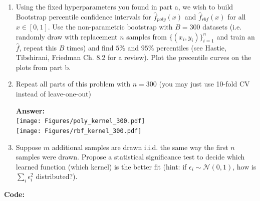 \documentclass{article}
\newcommand{\1}{\mathbf{1}}
\begin{document}
\begin{enumerate}
  \item Using the fixed hyperparameters you found in part a, we wish to build Bootstrap percentile confidence intervals for $\widehat{f}_{poly}(x)$ and $\widehat{f}_{rbf}(x)$ for all $x \in [0,1]$.
  Use the non-parametric bootstrap with $B=300$ datasets (i.e. randomly draw with replacement $n$ samples from $\{(x_i,y_i)\}_{i=1}^n$ and train an $\widehat{f}$, repeat this $B$ times) and find $5\%$ and $95\%$ percentiles (see Hastie, Tibshirani, Friedman Ch. 8.2 for a review). Plot the precentile curves on the plots from part b.
  \item Repeat all parts of this problem with $n=300$ (you may just use 10-fold CV instead of leave-one-out)
  
  \textbf{Answer:}\\
\texttt{[image: Figures/poly\_kernel\_300.pdf]}\\
\texttt{[image: Figures/rbf\_kernel\_300.pdf]}  

  \item Suppose $m$ additional samples are drawn i.i.d. the same way the first $n$ samples were drawn. Propose a statistical significance test to decide which learned function (which kernel) is the better fit (hint: if $\epsilon_i \sim \mathcal{N}(0,1)$, how is $\sum_i \epsilon_i^2$ distributed?).
\end{enumerate}
\textbf{Code:}
\end{document}
